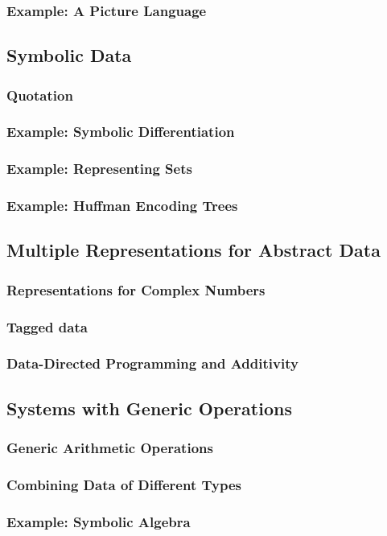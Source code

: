             \subsubsection{Example: A Picture Language}
        \subsection{Symbolic Data}
            \subsubsection{Quotation}
            \subsubsection{Example: Symbolic Differentiation}
            \subsubsection{Example: Representing Sets}
            \subsubsection{Example: Huffman Encoding Trees}
        \subsection{Multiple Representations for Abstract Data}
            \subsubsection{Representations for Complex Numbers}
            \subsubsection{Tagged data}
            \subsubsection{Data-Directed Programming and Additivity}
        \subsection{Systems with Generic Operations}
            \subsubsection{Generic Arithmetic Operations}
            \subsubsection{Combining Data of Different Types}
            \subsubsection{Example: Symbolic Algebra}

